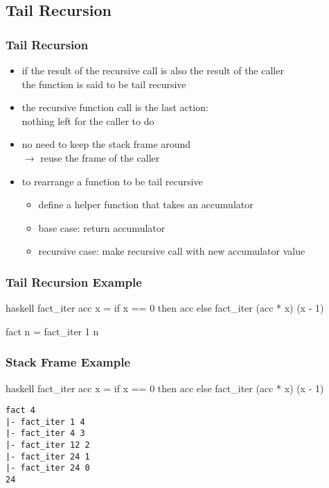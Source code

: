 \documentclass[dvipsnames]{beamer}
\theoremstyle{plain}
\begin{document}
\subsection{Tail Recursion}

\begin{frame}
  \frametitle{Tail Recursion}

  \begin{itemize}
    \item if the result of the recursive call is also the result of the caller\\
      the function is said to be \alert{tail recursive}
    \item the recursive function call is the last action:\\
      nothing left for the caller to do

    \pause
    \medskip
    \item no need to keep the stack frame around\\
      $\rightarrow$ reuse the frame of the caller

    \pause
    \medskip
    \item to rearrange a function to be tail recursive
    \begin{itemize}
      \item define a helper function that takes an \alert{accumulator}
      \item base case: return accumulator
      \item recursive case: make recursive call with new accumulator value
    \end{itemize}
  \end{itemize}
\end{frame}

\begin{frame}[fragile]
  \frametitle{Tail Recursion Example}

  \begin{example}[factorial]
    \begin{pygments}{haskell}
fact_iter acc x =
    if x == 0
    then acc
    else fact_iter (acc * x) (x - 1)

fact n = fact_iter 1 n
    \end{pygments}
  \end{example}
\end{frame}

\begin{frame}[fragile]
  \frametitle{Stack Frame Example}

  \begin{example}
    \begin{pygments}{haskell}
fact_iter acc x =
    if x == 0 then acc
    else fact_iter (acc * x) (x - 1)
    \end{pygments}

    \pause
    \begin{verbatim}
fact 4
|- fact_iter 1 4
|- fact_iter 4 3
|- fact_iter 12 2
|- fact_iter 24 1
|- fact_iter 24 0
24
    \end{verbatim}
  \end{example}
\end{frame}
\end{document}
